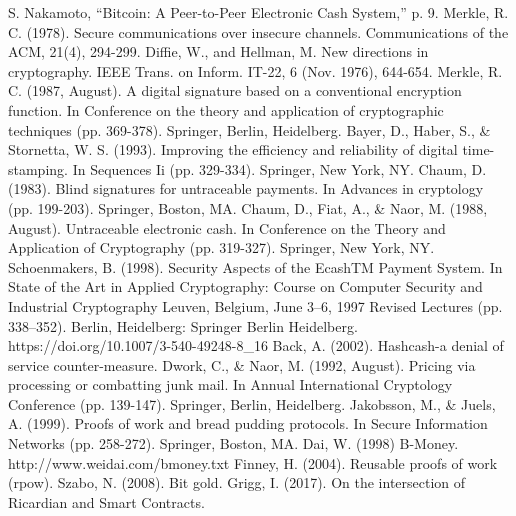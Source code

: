 \begin{thebibliography}{90}             %
\rhead[\fancyplain{}{\bfseries \leftmark}]{\fancyplain{}{\bfseries
\thepage}}
 S. Nakamoto, “Bitcoin: A Peer-to-Peer Electronic Cash System,” p. 9.
 Merkle, R. C. (1978). Secure communications over insecure channels. Communications of the ACM, 21(4), 294-299.
 Diffie, W., and Hellman, M. New directions in cryptography. IEEE Trans. on Inform. IT-22, 6 (Nov. 1976), 644-654.
 Merkle, R. C. (1987, August). A digital signature based on a conventional encryption function. In Conference on the theory and application of cryptographic techniques (pp. 369-378). Springer, Berlin, Heidelberg.
 Bayer, D., Haber, S., \& Stornetta, W. S. (1993). Improving the efficiency and reliability of digital time-stamping. In Sequences Ii (pp. 329-334). Springer, New York, NY.
 Chaum, D. (1983). Blind signatures for untraceable payments. In Advances in cryptology (pp. 199-203). Springer, Boston, MA.
 Chaum, D., Fiat, A., \& Naor, M. (1988, August). Untraceable electronic cash. In Conference on the Theory and Application of Cryptography (pp. 319-327). Springer, New York, NY.
 Schoenmakers, B. (1998). Security Aspects of the EcashTM Payment System. In State of the Art in Applied Cryptography: Course on Computer Security and Industrial Cryptography Leuven, Belgium, June 3–6, 1997 Revised Lectures (pp. 338–352). Berlin, Heidelberg: Springer Berlin Heidelberg. https://doi.org/10.1007/3-540-49248-8\_16
 Back, A. (2002). Hashcash-a denial of service counter-measure.
 Dwork, C., \& Naor, M. (1992, August). Pricing via processing or combatting junk mail. In Annual International Cryptology Conference (pp. 139-147). Springer, Berlin, Heidelberg.
 Jakobsson, M., \& Juels, A. (1999). Proofs of work and bread pudding protocols. In Secure Information Networks (pp. 258-272). Springer, Boston, MA.
 Dai, W. (1998) B-Money. http://www.weidai.com/bmoney.txt
 Finney, H. (2004). Reusable proofs of work (rpow).
 Szabo, N. (2008). Bit gold.
 Grigg, I. (2017). On the intersection of Ricardian and Smart Contracts.

\end{thebibliography}
